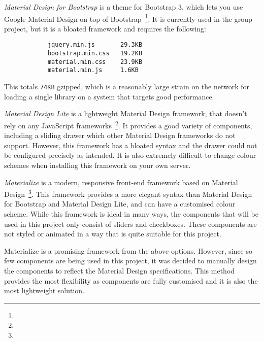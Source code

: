 {{		\emph{Material Design for Bootstrap} is a theme for Bootstrap 3, which lets you use Google Material Design on top of Bootstrap~\footnote{}. It is currently used in the group project, but it is a bloated framework and requires the following:

		\begin{verbatim}
			jquery.min.js 		29.3KB
			bootstrap.min.css 	19.2KB 
			material.min.css 	23.9KB
			material.min.js 	1.6KB
		\end{verbatim}

		This totals \texttt{74KB} gzipped, which is a reasonably large strain on the network for loading a single library on a system that targets good performance.
		
		\emph{Material Design Lite} is a lightweight Material Design framework, that doesn't rely on any JavaScript frameworks~\footnote{}. It provides a good variety of components, including a sliding drawer which other Material Design frameworks do not support. However, this framework has a bloated syntax and the drawer could not be configured precisely as intended. It is also extremely difficult to change colour schemes when installing this framework on your own server.

		\emph{Materialize} is a modern, responsive front-end framework based on Material Design~\footnote{}. This framework provides a more elegant syntax than Material Design for Bootstrap and Material Design Lite, and can have a customised colour scheme. While this framework is ideal in many ways, the components that will be used in this project only consist of sliders and checkboxes. These components are not styled or animated in a way that is quite suitable for this project.

		Materialize is a promising framework from the above options. However, since so few components are being used in this project, it was decided to manually design the components to reflect the Material Design specifications. This method provides the most flexibility as components are fully customised and it is also the most lightweight solution.

	}

}
